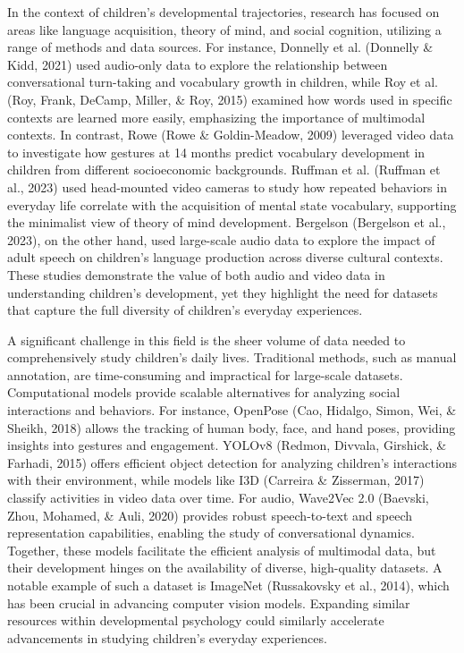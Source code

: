 \documentclass[
  man,floatsintext]{apa6}
\begin{document}
In the context of children's developmental trajectories, research has focused on areas like language acquisition, theory of mind, and social cognition, utilizing a range of methods and data sources. For instance, Donnelly et al. (Donnelly \& Kidd, 2021) used audio-only data to explore the relationship between conversational turn-taking and vocabulary growth in children, while Roy et al. (Roy, Frank, DeCamp, Miller, \& Roy, 2015) examined how words used in specific contexts are learned more easily, emphasizing the importance of multimodal contexts. In contrast, Rowe (Rowe \& Goldin-Meadow, 2009) leveraged video data to investigate how gestures at 14 months predict vocabulary development in children from different socioeconomic backgrounds. Ruffman et al. (Ruffman et al., 2023) used head-mounted video cameras to study how repeated behaviors in everyday life correlate with the acquisition of mental state vocabulary, supporting the minimalist view of theory of mind development. Bergelson (Bergelson et al., 2023), on the other hand, used large-scale audio data to explore the impact of adult speech on children's language production across diverse cultural contexts. These studies demonstrate the value of both audio and video data in understanding children's development, yet they highlight the need for datasets that capture the full diversity of children's everyday experiences.

A significant challenge in this field is the sheer volume of data needed to comprehensively study children's daily lives. Traditional methods, such as manual annotation, are time-consuming and impractical for large-scale datasets. Computational models provide scalable alternatives for analyzing social interactions and behaviors. For instance, OpenPose (Cao, Hidalgo, Simon, Wei, \& Sheikh, 2018) allows the tracking of human body, face, and hand poses, providing insights into gestures and engagement. YOLOv8 (Redmon, Divvala, Girshick, \& Farhadi, 2015) offers efficient object detection for analyzing children's interactions with their environment, while models like I3D (Carreira \& Zisserman, 2017) classify activities in video data over time. For audio, Wave2Vec 2.0 (Baevski, Zhou, Mohamed, \& Auli, 2020) provides robust speech-to-text and speech representation capabilities, enabling the study of conversational dynamics. Together, these models facilitate the efficient analysis of multimodal data, but their development hinges on the availability of diverse, high-quality datasets. A notable example of such a dataset is ImageNet (Russakovsky et al., 2014), which has been crucial in advancing computer vision models. Expanding similar resources within developmental psychology could similarly accelerate advancements in studying children's everyday experiences.
\end{document}
